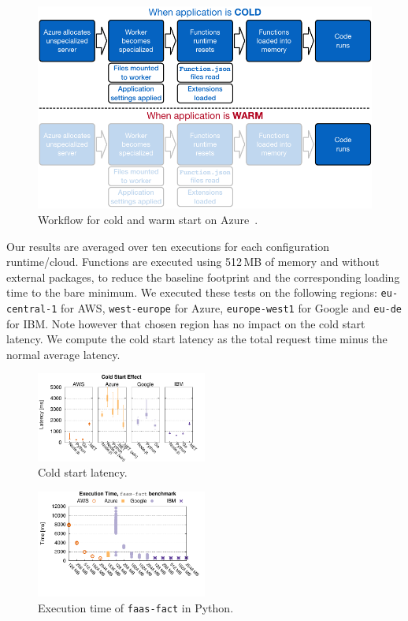\begin{figure}[!t]
\centering
\includegraphics[scale=0.6]{bilder/cold-warm}
\caption{Workflow for cold and warm start on Azure~\cite{AzureColdStart}.}
\label{fig:azure_coldstart}
\end{figure}

Our results are averaged over ten executions for each configuration runtime/cloud. 
Functions are executed using 512\,\gls{MB} of memory and without external packages, to reduce the baseline footprint and the corresponding loading time to the bare minimum.
We executed these tests on the following regions: \texttt{eu-central-1} for AWS, \texttt{west-europe} for Azure,  \texttt{europe-west1} for Google and \texttt{eu-de} for IBM. 
Note however that chosen region has no impact on the cold start latency. 
We compute the cold start latency as the total request time minus the normal average latency.

\begin{figure}[!t]
\centering
\includegraphics[width=0.5\textwidth]{bilder/cold_start/coldstart_whisker.pdf}
\caption{Cold start latency.}
\label{fig:coldstart_plot}
\end{figure}

\begin{figure}[!t]
\centering
\includegraphics[width=0.5\textwidth, trim={0 40 0 0}]{bilder/general_python/cpufact.pdf}
\caption{Execution time of \texttt{faas-fact} in Python.}
\label{fig:general_python_plot}
\end{figure}

